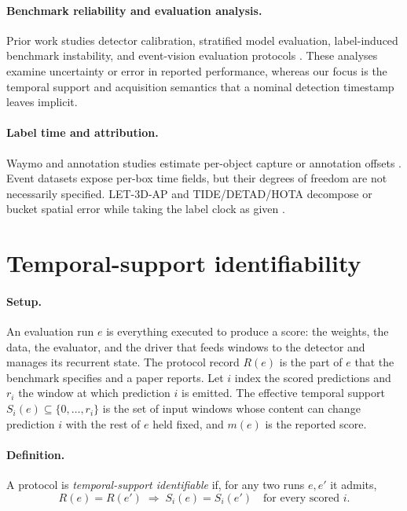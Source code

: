 \documentclass[10pt,twocolumn,letterpaper]{article}
\begin{document}
\paragraph{Benchmark reliability and evaluation analysis.}
Prior work studies detector calibration, stratified model evaluation, label-induced benchmark
instability, and event-vision evaluation protocols
\cite{oncalibration2024,stratification2024,northcutt2021labelerrors,ercan2023evreal}.
These analyses examine uncertainty or error in reported performance, whereas our focus is the
temporal support and acquisition semantics that a nominal detection timestamp leaves implicit.

\paragraph{Label time and attribution.}
Waymo and annotation studies estimate per-object capture or annotation offsets
\cite{waymolabelproto,sun2020waymo,nunez2026annotations}. Event datasets expose
per-box time fields, but their degrees of freedom are not necessarily specified.
LET-3D-AP and TIDE/DETAD/HOTA decompose or bucket spatial error while taking the
label clock as given \cite{hung2022let,bolya2020tide,hoiem2012diagnosing,alwassel2018detad,luiten2021hota}.

\section{Temporal-support identifiability}
\label{sec:def}

\paragraph{Setup.}
An evaluation run $e$ is everything executed to produce a score: the weights, the data, the evaluator, and the driver that feeds windows to the detector and manages its recurrent state. The protocol record $R(e)$ is the part of $e$ that the benchmark specifies and a paper reports. Let $i$ index the scored predictions and $r_i$ the window at which prediction $i$ is emitted. The effective temporal support $S_i(e)\subseteq\{0,\dots,r_i\}$ is the set of input windows whose content can change prediction $i$ with the rest of $e$ held fixed, and $m(e)$ is the reported score.

\paragraph{Definition.}
A protocol is \emph{temporal-support identifiable} if, for any two runs $e,e'$ it admits,
\begin{equation}
R(e)=R(e')\;\Longrightarrow\; S_i(e)=S_i(e')\quad\text{for every scored } i .
\label{eq:ident}
\end{equation}
\end{document}
